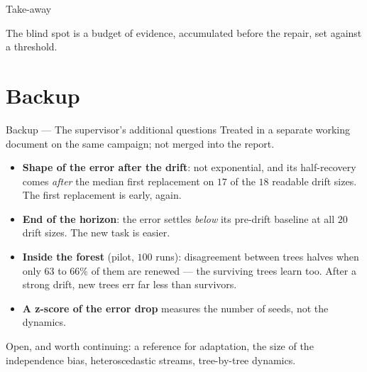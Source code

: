\documentclass[aspectratio=169,11pt]{beamer}
\begin{document}
\begin{frame}{Take-away}
  \begin{center}
    \small\alert{The blind spot is a budget of evidence, accumulated before the repair, set
    against a threshold.}
  \end{center}
  \vspace{-0.5em}
  \begin{center}\end{center}
\end{frame}

\appendix
\section*{Backup}

\begin{frame}{Backup --- The supervisor's additional questions}
  {\small Treated in a separate working document on the same campaign; not merged into the report.}
  \begin{itemize}
    \item \textbf{Shape of the error after the drift}: not exponential, and its half-recovery comes
          \emph{after} the median first replacement on $17$ of the $18$ readable drift sizes.
          The first replacement is early, again.
    \item \textbf{End of the horizon}: the error settles \emph{below} its pre-drift baseline at all
          $20$ drift sizes. The new task is easier.
    \item \textbf{Inside the forest} (pilot, $100$ runs): disagreement between trees halves when only
          $63$ to $66\%$ of them are renewed --- the surviving trees learn too. After a strong drift,
          new trees err far less than survivors.
    \item \textbf{A z-score of the error drop} measures the number of seeds, not the dynamics.
  \end{itemize}
  \vfill
  {\small\color{gray} Open, and worth continuing: a reference for adaptation, the size of the
  independence bias, heteroscedastic streams, tree-by-tree dynamics.}
\end{frame}
\end{document}
